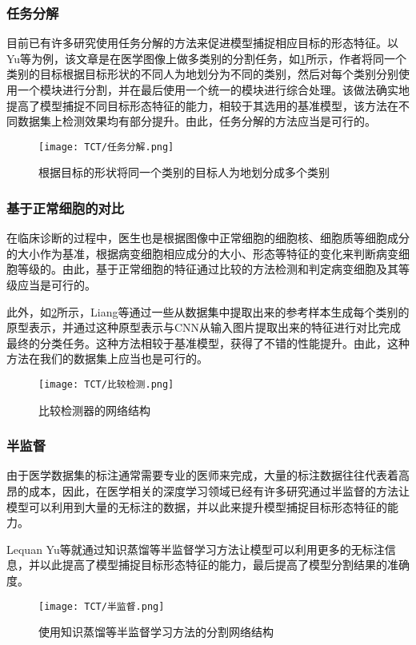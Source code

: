 \subsubsection{任务分解}
\par 目前已有许多研究使用任务分解的方法来促进模型捕捉相应目标的形态特征。以Yu等\cite{zhang2019decompose}为例，该文章是在医学图像上做多类别的分割任务，如\ref{任务分解}所示，作者将同一个类别的目标根据目标形状的不同人为地划分为不同的类别，然后对每个类别分别使用一个模块进行分割，并在最后使用一个统一的模块进行综合处理。该做法确实地提高了模型捕捉不同目标形态特征的能力，相较于其选用的基准模型，该方法在不同数据集上检测效果均有部分提升。由此，任务分解的方法应当是可行的。
\begin{figure}[h]
    \centering
    \texttt{[image: TCT/任务分解.png]}
    \caption{根据目标的形状将同一个类别的目标人为地划分成多个类别}
    \label{任务分解}
\end{figure}
\subsubsection{基于正常细胞的对比}
\par 在临床诊断的过程中，医生也是根据图像中正常细胞的细胞核、细胞质等细胞成分的大小作为基准，根据病变细胞相应成分的大小、形态等特征的变化来判断病变细胞等级的。由此，基于正常细胞的特征通过比较的方法检测和判定病变细胞及其等级应当是可行的。
\par 此外，如\ref{比较检测}所示，Liang等\cite{liang2018comparison}通过一些从数据集中提取出来的参考样本生成每个类别的原型表示，并通过这种原型表示与CNN从输入图片提取出来的特征进行对比完成最终的分类任务。这种方法相较于基准模型，获得了不错的性能提升。由此，这种方法在我们的数据集上应当也是可行的。
\begin{figure}[h]
    \centering
    \texttt{[image: TCT/比较检测.png]}
    \caption{比较检测器的网络结构}
    \label{比较检测}
\end{figure}
\subsubsection{半监督}
\par 由于医学数据集的标注通常需要专业的医师来完成，大量的标注数据往往代表着高昂的成本，因此，在医学相关的深度学习领域已经有许多研究通过半监督的方法让模型可以利用到大量的无标注的数据，并以此来提升模型捕捉目标形态特征的能力。
\par Lequan Yu等\cite{yu2019uncertainty}就通过知识蒸馏等半监督学习方法让模型可以利用更多的无标注信息，并以此提高了模型捕捉目标形态特征的能力，最后提高了模型分割结果的准确度。
\begin{figure}[h]
    \centering
    \texttt{[image: TCT/半监督.png]}
    \caption{使用知识蒸馏等半监督学习方法的分割网络结构}
    \label{半监督}
\end{figure}
